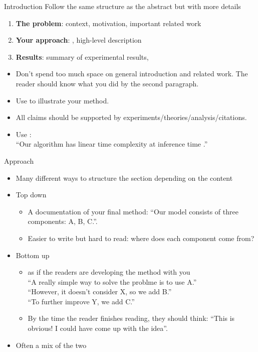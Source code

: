 \documentclass[usenames,dvipsnames,11pt,aspectratio=169]{beamer}
\begin{document}
\begin{frame}
    {Introduction}
    Follow the same structure as the abstract but with more details\\
    \begin{enumerate}
        \item {\bf The problem}: context, motivation, important related work 
        \item {\bf Your approach}: , high-level description
        \item {\bf Results}: summary of experimental results, 
    \end{enumerate}
    \begin{itemize}
        \item Don't spend too much space on general introduction and related work. The reader should know what you did by the second paragraph.
        \item Use  to illustrate your method.
        \item All claims should be supported by experiments/theories/analysis/citations.
        \item Use :\\
            ``Our algorithm has linear time complexity at inference time .''
    \end{itemize}
\end{frame}

\begin{frame}
    {Approach}
    \begin{itemize}
        \item Many different ways to structure the section depending on the content 
        \item Top down
            \begin{itemize}
                \item A documentation of your final method: ``Our model consists of three components: A, B, C.''.
                \item Easier to write but hard to read: where does each component come from?
            \end{itemize}
        \item Bottom up
            \begin{itemize}
                \item {} as if the readers are developing the method with you\\
                    ``A really simple way to solve the problme is to use A.''\\
                    ``However, it doesn't consider X, so we add B.''\\
                    ``To further improve Y, we add C.''
                \item By the time the reader finishes reading, they should think: ``This is obvious! I could have come up with the idea''.
            \end{itemize}
        \item Often a mix of the two
    \end{itemize}
\end{frame}
\end{document}
